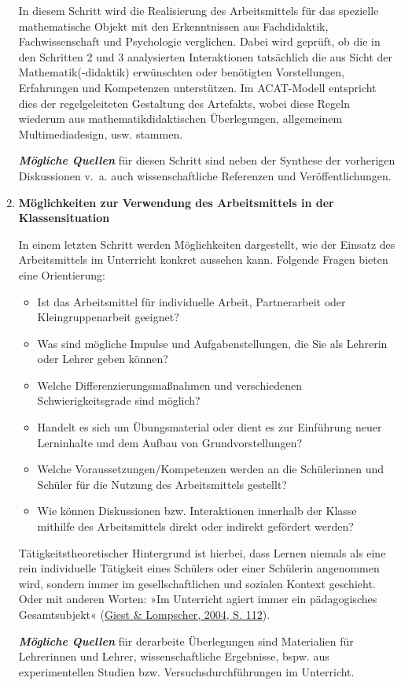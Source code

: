 \documentclass[
  ngerman,
]{scrbook}
\providecommand{\tightlist}{%
  \setlength{\itemsep}{0pt}\setlength{\parskip}{0pt}}
\theoremstyle{definition}
\theoremstyle{definition}
\theoremstyle{definition}
\theoremstyle{definition}
\theoremstyle{remark}
\begin{document}
\begin{enumerate}
  In diesem Schritt wird die Realisierung des Arbeitsmittels für das spezielle mathematische Objekt mit den Erkenntnissen aus Fachdidaktik, Fachwissenschaft und Psychologie verglichen. Dabei wird geprüft, ob die in den Schritten 2 und 3 analysierten Interaktionen tatsächlich die aus Sicht der Mathematik(-didaktik) erwünschten oder benötigten Vorstellungen, Erfahrungen und Kompetenzen unterstützen. Im ACAT-Modell entspricht dies der regelgeleiteten Gestaltung des Artefakts, wobei diese Regeln wiederum aus mathematikdidaktischen Überlegungen, allgemeinem Multimediadesign, usw. stammen.

  \textbf{\emph{Mögliche Quellen}} für diesen Schritt sind neben der Synthese der vorherigen Diskussionen v.~a. auch wissenschaftliche Referenzen und Veröffentlichungen.
\item
  \textbf{Möglichkeiten zur Verwendung des Arbeitsmittels in der Klassensituation }

  In einem letzten Schritt werden Möglichkeiten dargestellt, wie der Einsatz des Arbeitsmittels im Unterricht konkret aussehen kann. Folgende Fragen bieten eine Orientierung:

  \begin{itemize}
  \tightlist
  \item
    Ist das Arbeitsmittel für individuelle Arbeit, Partnerarbeit oder Kleingruppenarbeit geeignet?
  \item
    Was sind mögliche Impulse und Aufgabenstellungen, die Sie als Lehrerin oder Lehrer geben können?
  \item
    Welche Differenzierungsmaßnahmen und verschiedenen Schwierigkeitsgrade sind möglich?
  \item
    Handelt es sich um Übungsmaterial oder dient es zur Einführung neuer Lerninhalte und dem Aufbau von Grundvorstellungen?
  \item
    Welche Voraussetzungen/Kompetenzen werden an die Schülerinnen und Schüler für die Nutzung des Arbeitsmittels gestellt?
  \item
    Wie können Diskussionen bzw. Interaktionen innerhalb der Klasse mithilfe des Arbeitsmittels direkt oder indirekt gefördert werden?
  \end{itemize}

  Tätigkeitstheoretischer Hintergrund ist hierbei, dass Lernen niemals als eine rein individuelle Tätigkeit eines Schülers oder einer Schülerin angenommen wird, sondern immer im gesellschaftlichen und sozialen Kontext geschieht. Oder mit anderen Worten: »Im Unterricht agiert immer ein pädagogisches Gesamtsubjekt« (\protect\hyperlink{ref-Giest2004a}{Giest \& Lompscher, 2004, S. 112}).

  \textbf{\emph{Mögliche Quellen}} für derarbeite Überlegungen sind Materialien für Lehrerinnen und Lehrer, wissenschaftliche Ergebnisse, bspw. aus experimentellen Studien bzw. Versuchsdurchführungen im Unterricht.
\end{enumerate}
\end{document}
